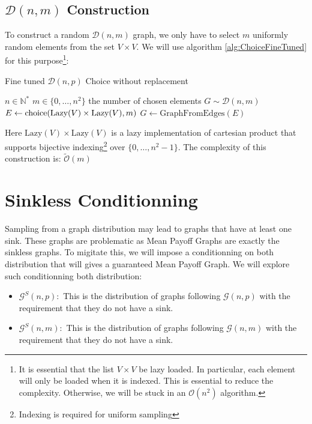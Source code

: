\subsection{$\mathcal{D}(n,m)$ Construction}
To construct a random $\mathcal{D}(n,m)$ graph, we only have to select $m$ uniformly random elements from the set $V\times V.$
\newline We will use algorithm \ref{alg:ChoiceFineTuned} for this purpose\footnote{It is essential that the list $V\times V$ be lazy loaded. In particular, each element will only be loaded when it is indexed. This is essential to reduce the complexity. Otherwise, we will be stuck in an $\mathcal{O}(n^2)$ algorithm.}:
\begin{algorithm}
	\caption{Fine tuned $\mathcal{D}(n,p)$ Choice without replacement }\label{Dnm} 
	\begin{algorithmic}
		\Require $n\in\mathbb{N}^*$
		\Require $m\in\{0,\dots,n^2\}$ the number of chosen elements
		\Ensure $G\sim \mathcal{D}(n,m)$
		\State $E\leftarrow \operatorname{choice}(\text{Lazy}(V)\times \text{Lazy}(V),m)$ 
		\State \Return $G\leftarrow \text{GraphFromEdges}(E)$
	\end{algorithmic}
\end{algorithm}
\FloatBarrier
Here $\text{Lazy}(V)\times \text{Lazy}(V)$ is a lazy implementation of cartesian product that supports bijective indexing\footnote{Indexing is required for uniform sampling} over $\{0,\dots,n^2-1\}.$
\newline The complexity of this construction is: $
\tilde{\mathcal{O}}(m)
$ 

\section{Sinkless Conditionning}
Sampling from a graph distribution may lead to graphs that have at least one sink. 
\newline These graphs are problematic as Mean Payoff Graphs are exactly the sinkless graphs.
\newline To migitate this, we will impose a conditionning on both distribution that will gives a guaranteed Mean Payoff Graph.
\newline We will explore such conditionning both distribution:
\begin{itemize}
	\item $\mathcal{G}^S(n,p):$ This is the distribution of graphs following $\mathcal{G}(n,p)$ with the requirement that they do not have a sink.
	\item $\mathcal{G}^S(n,m):$ This is the distribution of graphs following $\mathcal{G}(n,m)$ with the requirement that they do not have a sink.
\end{itemize}
